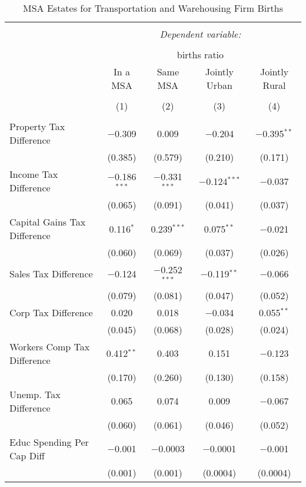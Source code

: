 
\begin{table}[!htbp] \centering 
  \caption{MSA Estates for  Transportation and Warehousing Firm Births} 
  \label{48-49metro} 
\begin{tabular}{@{\extracolsep{5pt}}lcccc} 
\\[-1.8ex]\hline 
\hline \\[-1.8ex] 
 & \multicolumn{4}{c}{\textit{Dependent variable:}} \\ 
\cline{2-5} 
\\[-1.8ex] & \multicolumn{4}{c}{births ratio} \\ 
 & In a MSA & Same MSA & Jointly Urban & Jointly Rural \\ 
\\[-1.8ex] & (1) & (2) & (3) & (4)\\ 
\hline \\[-1.8ex] 
 Property Tax Difference & $-$0.309 & 0.009 & $-$0.204 & $-$0.395$^{**}$ \\ 
  & (0.385) & (0.579) & (0.210) & (0.171) \\ 
  Income Tax Difference & $-$0.186$^{***}$ & $-$0.331$^{***}$ & $-$0.124$^{***}$ & $-$0.037 \\ 
  & (0.065) & (0.091) & (0.041) & (0.037) \\ 
  Capital Gains Tax Difference & 0.116$^{*}$ & 0.239$^{***}$ & 0.075$^{**}$ & $-$0.021 \\ 
  & (0.060) & (0.069) & (0.037) & (0.026) \\ 
  Sales Tax Difference & $-$0.124 & $-$0.252$^{***}$ & $-$0.119$^{**}$ & $-$0.066 \\ 
  & (0.079) & (0.081) & (0.047) & (0.052) \\ 
  Corp Tax Difference & 0.020 & 0.018 & $-$0.034 & 0.055$^{**}$ \\ 
  & (0.045) & (0.068) & (0.028) & (0.024) \\ 
  Workers Comp Tax Difference & 0.412$^{**}$ & 0.403 & 0.151 & $-$0.123 \\ 
  & (0.170) & (0.260) & (0.130) & (0.158) \\ 
  Unemp. Tax Difference & 0.065 & 0.074 & 0.009 & $-$0.067 \\ 
  & (0.060) & (0.061) & (0.046) & (0.052) \\ 
  Educ Spending Per Cap Diff & $-$0.001 & $-$0.0003 & $-$0.0001 & $-$0.001 \\ 
  & (0.001) & (0.001) & (0.0004) & (0.0004) \\ 

\end{tabular}
\end{table}

